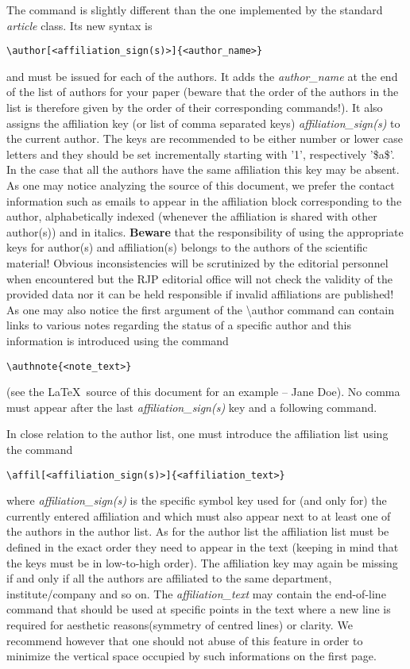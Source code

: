 \documentclass[myclassdoc,debug]{rjparticle}
\begin{document}
The {\small {}} command is slightly different than the one implemented by the standard \textit{article} class. Its new syntax is
\begin{lstlisting}
\author[<affiliation_sign(s)>]{<author_name>}
\end{lstlisting}
and must be issued for each of the authors. It adds the \textit{author\_name} at the end of the list of authors for your paper (beware that the order of the authors in the list is therefore given by the order of their corresponding {\small {}} commands!). It also assigns the affiliation key (or list of comma separated keys) \textit{affiliation\_sign(s)} to the current author. The keys are recommended to be either number or lower case letters and they should be set incrementally starting with '1', respectively '\$a\$'. In the case that all the authors have the same affiliation this key may be absent. As one may notice analyzing the source of this document, we prefer the contact information such as emails to appear in the affiliation block corresponding to the author, alphabetically indexed (whenever the affiliation is shared with other author(s)) and in italics. \textbf{Beware} that the responsibility of using the appropriate keys for author(s) and affiliation(s) belongs to the authors of the 
scientific material! 
Obvious inconsistencies will be scrutinized by the editorial personnel when encountered but the RJP editorial office will not check the validity of the provided data nor it can be held responsible if invalid affiliations are published! As one may also notice the first argument of the \textbackslash author command can contain links to various notes regarding the status of a specific author and this information is introduced using the command 
\begin{lstlisting}
\authnote{<note_text>}
\end{lstlisting}
(see the \LaTeX ~source of this document for an example -- Jane Doe). No comma must appear after the last \textit{affiliation\_sign(s)} key and a following  command.


In close relation to the author list, one must introduce the affiliation list using the command
\begin{lstlisting}
\affil[<affiliation_sign(s)>]{<affiliation_text>}
\end{lstlisting}
where \textit{affiliation\_sign(s)} is the specific symbol key used for (and only for) the currently entered affiliation and which must also appear next to at least one of the authors in the author list. As for the author list the affiliation list must be defined in the exact order they need to appear in the text (keeping in mind that the keys must be in low-to-high order). The affiliation key may again be missing if and only if all the authors are affiliated to the same department, institute/company and so on. The \textit{affiliation\_text} may contain the end-of-line command that should be used at specific points in the text where a new line is required for aesthetic reasons(symmetry of centred lines) or clarity. We recommend however that one should not abuse of this feature in order to minimize the vertical space occupied by such informations on the first page.
\end{document}
